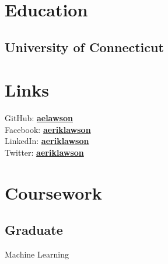 \documentclass[]{deedy-resume}
\begin{document}
%
%

%
%

%
%

\begin{minipage}[t]{0.38\textwidth}


\section{Education}

\subsection{University of Connecticut}


\section{Links}
GitHub: \href{https://github.com/aelawson}{\bf aelawson} \\
Facebook: \href{https://facebook.com/aeriklawson}{\bf aeriklawson} \\
LinkedIn:  \href{https://www.linkedin.com/in/aeriklawson}{\bf aeriklawson} \\
Twitter:  \href{https://twitter.com/aeriklawson}{\bf aeriklawson} \\


\section{Coursework}
\subsection{Graduate}
Machine Learning \\
\sectionsep


\end{minipage}
\end{document}

